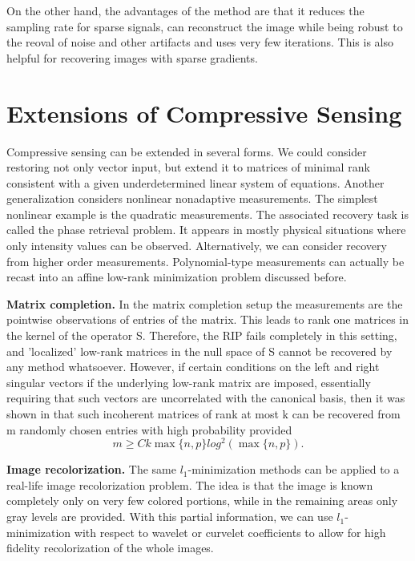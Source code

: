 \documentclass[
  english,        %
  font=times,     %
  onecolumn,      %
]{tumarticle}
\numberwithin{equation}{section} %
\begin{document}
\begin{large}
\begin{adjustwidth}{0pt}{0pt}
On the other hand, the advantages of the method are that it reduces the sampling rate for sparse signals, can reconstruct the image while being robust to the reoval of noise and other artifacts and uses very few iterations. This is also helpful for recovering images with sparse gradients.


\section{Extensions of Compressive Sensing}

Compressive sensing can be extended in several forms. We could consider restoring not only vector input, but extend it to matrices of minimal rank consistent with a given underdetermined linear system of equations. Another generalization considers nonlinear nonadaptive measurements. The simplest nonlinear example is the quadratic measurements. The associated recovery task is called the phase retrieval problem. It appears in mostly physical situations where only intensity values can be observed. Alternatively, we can consider recovery from higher order measurements. Polynomial-type measurements can actually be recast into an affine low-rank minimization problem discussed before.

\textbf{Matrix completion.} In the matrix completion setup the measurements are the pointwise observations of entries of the matrix. This leads to rank one matrices in the kernel of the operator S. Therefore, the RIP fails completely in this setting, and 'localized' low-rank matrices in the null space of S cannot be recovered by any method whatsoever. However, if certain conditions on the left and right singular vectors if the underlying low-rank matrix are imposed, essentially requiring that such vectors are uncorrelated with the canonical basis, then it was shown in \cite{Matrix-Completion} that such incoherent matrices of rank at most k can be recovered from m randomly chosen entries with high probability provided
\[ m \geq C k \max\{n,p\} log^2 (\max\{n,p\}) .\]

\textbf{Image recolorization.} The same $l_1$-minimization methods can be applied to a real-life image recolorization problem. The idea is that the image is known completely only on very few colored portions, while in the remaining areas only gray levels are provided. With this partial information, we can use $l_1$-minimization with respect to wavelet or curvelet coefficients to allow for high fidelity recolorization of the whole images.


\end{adjustwidth}
\end{large}
\end{document}
